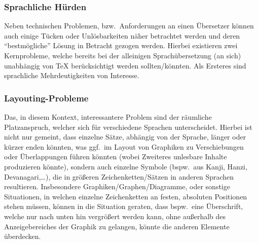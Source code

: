 \subsubsection{Sprachliche Hürden}
Neben technischen Problemen, bzw.\ Anforderungen an einen Übersetzer können auch einige Tücken oder Unlösbarkeiten näher betrachtet werden und deren \enquote{bestmögliche} Lösung in Betracht gezogen werden. Hierbei existieren zwei Kernprobleme, welche bereits bei der alleinigen Sprachübersetzung (an sich) unabhängig von \TeX{} berücksichtigt werden sollten/könnten. Als Ersteres sind sprachliche Mehrdeutigkeiten von Interesse. 

\subsubsection{Layouting-Probleme}
Das, in diesem Kontext, interessantere Problem sind der räumliche Platzanspruch, welcher sich für verschiedene Sprachen unterscheidet. Hierbei ist nicht nur gemeint, dass einzelne Sätze, abhängig von der Sprache, länger oder kürzer enden könnten, was ggf.\ im Layout von Graphiken zu Verschiebungen oder Überlappungen führen könnten (wobei Zweiteres unlesbare Inhalte produzieren könnte), sondern auch einzelne Symbole (bspw.\ aus Kanji, Hanzi, Devanagari,\ldots), die in größeren Zeichenketten/Sätzen in anderen Sprachen resultieren. Insbesondere Graphiken/Graphen/Diagramme, oder sonstige Situationen, in welchen einzelne Zeichenketten an festen, absoluten Positionen stehen müssen, können in die Situation geraten, dass bspw.\ eine Überschrift, welche nur nach unten hin vergrößert werden kann, ohne außerhalb des Anzeigebereiches der Graphik zu gelangen, könnte die anderen Elemente überdecken. 



